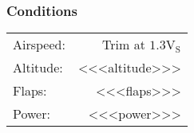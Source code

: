 % 
% 
%
 \subsubsection*{Conditions}
 \noindent\begin{tabular}{p{1.5 in}r}
 Airspeed:&Trim at $\mathrm{1.3V_{S}}$\\
 Altitude:&<<<altitude>>>\\
 Flaps:&<<<flaps>>>\\
 Power:&<<<power>>>\\
 \end{tabular}
